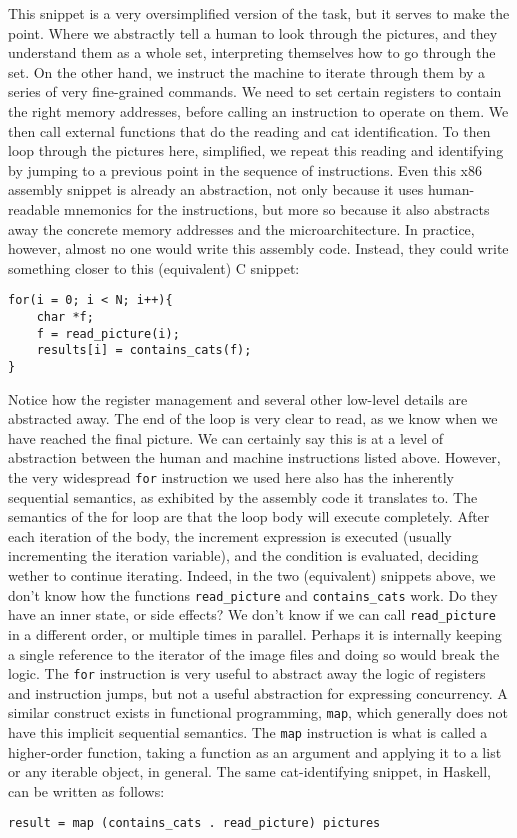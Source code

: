 This snippet is a very oversimplified version of the task, but it serves to make the point.
Where we abstractly tell a human to look through the pictures, and they understand them as a whole set, interpreting themselves how to go through the set.
On the other hand, we instruct the machine to iterate through them by a series of very fine-grained commands.
We need to set certain registers to contain the right memory addresses, before calling an instruction to operate on them.
We then call external functions that do the reading and cat identification.
To then loop through the pictures here, simplified, we repeat this reading and identifying by jumping to a previous point in the sequence of instructions.
Even this x86 assembly snippet is already an abstraction, not only because it uses human-readable mnemonics for the instructions, but more so because it also abstracts away the concrete memory addresses and the microarchitecture.
In practice, however, almost no one would write this assembly code. Instead, they could write something closer to this (equivalent) C snippet:
\begin{verbatim}
for(i = 0; i < N; i++){
    char *f;
    f = read_picture(i);
    results[i] = contains_cats(f); 
}
\end{verbatim}

Notice how the register management and several other low-level details are abstracted away.
The end of the loop is very clear to read, as we know when we have reached the final picture.
We can certainly say this is at a level of abstraction between the human and machine instructions listed above.
However, the very widespread \texttt{for} instruction we used here also has the inherently sequential semantics, as exhibited by the assembly code it translates to.
The semantics of the for loop are that the loop body will execute completely.
After each iteration of the body, the increment expression is executed (usually incrementing the iteration variable), and the condition is evaluated, deciding wether to continue iterating.
Indeed, in the two (equivalent) snippets above, we don't know how the functions \texttt{read\_picture} and \texttt{contains\_cats} work.
Do they have an inner state, or side effects?
We don't know if we can call \texttt{read\_picture} in a different order, or multiple times in parallel.
Perhaps it is internally keeping a single reference to the iterator of the image files and doing so would break the logic.
The \texttt{for} instruction is very useful to abstract away the logic of registers and instruction jumps, but not a useful abstraction for expressing concurrency.
A similar construct exists in functional programming, \texttt{map}, which generally does not have this implicit sequential semantics.
The \texttt{map} instruction is what is called a higher-order function, taking a function as an argument and applying it to a list or any iterable object, in general.
The same cat-identifying snippet, in Haskell, can be written as follows:
\begin{verbatim}
result = map (contains_cats . read_picture) pictures
\end{verbatim}

